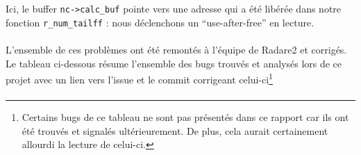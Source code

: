 Ici, le buffer \lstinline{nc->calc_buf} pointe vers une adresse qui a été libérée dans notre fonction \lstinline{r_num_tailff} : nous déclenchons un ``use-after-free'' en lecture.

\paragraph{}
L'ensemble de ces problèmes ont été remontés à l'équipe de Radare2 et corrigés.
Le tableau ci-dessous résume l'ensemble des bugs trouvés et analysés lors de ce projet avec un lien vers l'issue et le commit corrigeant celui-ci\footnote{Certains bugs de ce tableau ne sont pas présentés dans ce rapport car ils ont été trouvés et signalés ultérieurement. De plus, cela aurait certainement allourdi la lecture de celui-ci.}

\paragraph{}
